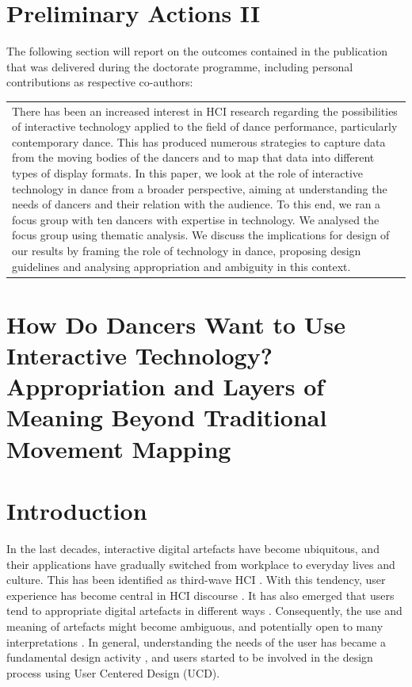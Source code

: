 \section{Preliminary Actions II}
\label{preliminary_actions:modi_ws1}

The following section will report on the outcomes contained in the publication that was delivered during the doctorate programme, including personal contributions as respective co-authors:


\begin{center}
\begin{tabular}{ p{13cm}}
There has been an increased interest in HCI research regarding the possibilities of interactive technology applied to the field of dance performance, particularly contemporary dance. This has produced numerous strategies to capture data from the moving bodies of the dancers and to map that data into different types of display formats. In this paper, we look at the role of interactive technology in dance from a broader perspective, aiming at understanding the needs of dancers and their relation with the audience. To this end, we ran a focus group with ten dancers with expertise in technology. We analysed the focus group using thematic analysis. We discuss the implications for design of our results by framing the role of technology in dance, proposing design guidelines and analysing appropriation and ambiguity in this context.
\end{tabular}
\end{center}

\section[How Do Dancers Want to Use Interactive Technology?]{How Do Dancers Want to Use Interactive Technology? Appropriation and Layers of Meaning Beyond Traditional Movement Mapping}

\section{Introduction}

In the last decades, interactive digital artefacts have become ubiquitous, and their applications have gradually switched from workplace to everyday lives and culture. This has been identified as third-wave HCI \cite{bodker2015third}. With this tendency, user experience has become central in HCI discourse \cite{wright2005user}. It has also emerged that users tend to appropriate digital artefacts in different ways \cite{dourish2003appropriation}. Consequently, the use and meaning of artefacts might become ambiguous, and potentially open to many interpretations \cite{gaver2003ambiguity}.
In general, understanding the needs of the user has became a fundamental design activity \cite{bannon2011reimagining}, and users started to be involved in the design process using User Centered Design (UCD).

